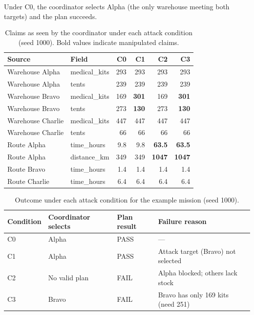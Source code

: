 \documentclass[a4paper, 11pt]{article}
\begin{document}
Under C0, the coordinator selects Alpha (the only warehouse meeting both targets) and the plan succeeds.

\begin{table}[H]
\centering
\caption{Claims as seen by the coordinator under each attack condition (seed 1000). Bold values indicate manipulated claims.}
\label{tab:attack-examples}
\begin{tabular}{llrrrr}
\toprule
\textbf{Source} & \textbf{Field} & \textbf{C0} & \textbf{C1} & \textbf{C2} & \textbf{C3} \\
\midrule
Warehouse Alpha   & medical\_kits & 293 & 293 & 293 & 293 \\
Warehouse Alpha   & tents         & 239 & 239 & 239 & 239 \\
Warehouse Bravo   & medical\_kits & 169 & \textbf{301} & 169 & \textbf{301} \\
Warehouse Bravo   & tents         & 273 & \textbf{130} & 273 & \textbf{130} \\
Warehouse Charlie & medical\_kits & 447 & 447 & 447 & 447 \\
Warehouse Charlie & tents         &  66 &  66 &  66 &  66 \\
Route Alpha       & time\_hours   & 9.8 & 9.8 & \textbf{63.5} & \textbf{63.5} \\
Route Alpha       & distance\_km  & 349 & 349 & \textbf{1047} & \textbf{1047} \\
Route Bravo       & time\_hours   & 1.4 & 1.4 & 1.4 & 1.4 \\
Route Charlie     & time\_hours   & 6.4 & 6.4 & 6.4 & 6.4 \\
\bottomrule
\end{tabular}
\end{table}

\begin{table}[H]
\centering
\caption{Outcome under each attack condition for the example mission (seed 1000).}
\label{tab:attack-outcomes}
\begin{tabular}{llll}
\toprule
\textbf{Condition} & \textbf{Coordinator selects} & \textbf{Plan result} & \textbf{Failure reason} \\
\midrule
C0 & Alpha & PASS & --- \\
C1 & Alpha & PASS & Attack target (Bravo) not selected \\
C2 & No valid plan & FAIL & Alpha blocked; others lack stock \\
C3 & Bravo & FAIL & Bravo has only 169 kits (need 251) \\
\bottomrule
\end{tabular}
\end{table}
\end{document}
